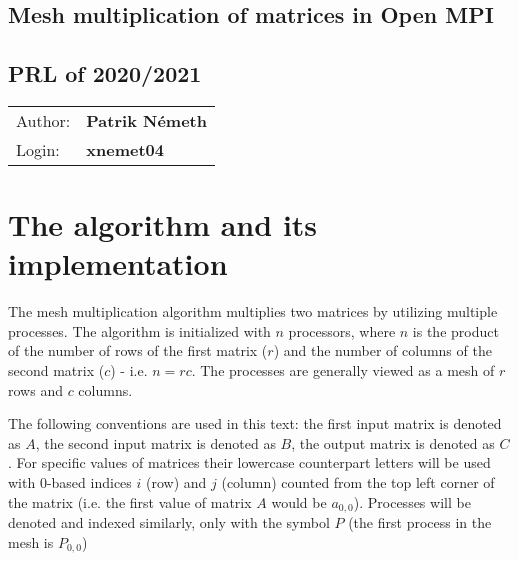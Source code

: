\documentclass[pdftex, 11pt, a4paper, titlepage]{article}
\begin{document}
    \begin{center}
        \section*{Mesh multiplication of matrices in Open MPI}
        \subsection*{PRL of 2020/2021}
        \begin{tabular}{ l l }
            Author: & \textbf{Patrik Németh} \\
            Login: & \textbf{xnemet04}
        \end{tabular}
    \end{center}

    \section{The algorithm and its implementation}
    The mesh multiplication algorithm multiplies two matrices by utilizing multiple
    processes.
    The algorithm is initialized with $n$ processors, where $n$ is the product of
    the number of rows of the first matrix ($r$) and the number of columns of the
    second matrix ($c$) - i.e. $n = rc$. The processes are generally viewed as
    a mesh of $r$ rows and $c$ columns.

    The following conventions are used in this text: the first input matrix is
    denoted as $A$, the second input matrix is denoted as $B$, the output matrix
    is denoted as $C$. For specific values of matrices their lowercase counterpart
    letters will be used with $0$-based indices $i$ (row) and $j$ (column) counted
    from the top left corner of the matrix (i.e. the first value of matrix $A$ would
    be $a_{0,0}$). Processes will be denoted and indexed similarly, only with the
    symbol $P$ (the first process in the mesh is $P_{0,0}$)
\end{document}
